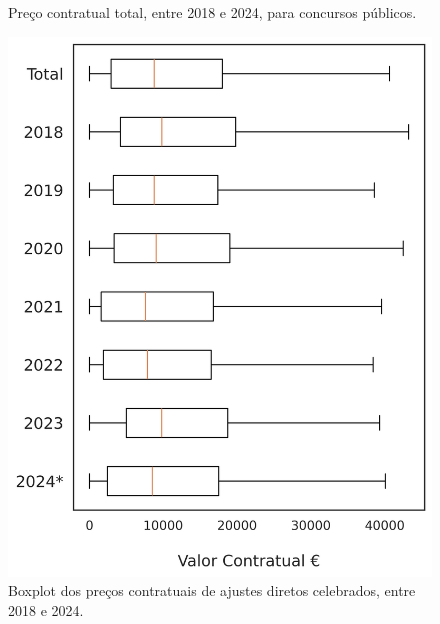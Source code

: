 \begin{figure}[H]
\begin{minipage}{.31\linewidth}
		\caption{Preço contratual total, entre 2018 e 2024, para concursos públicos.}
		\label{fig:precocps2}
	\end{minipage}
\end{figure}

\vfill

\begin{figure}[H]
	\centering
	\begin{minipage}{.31\linewidth}
		\includegraphics[width=\linewidth]{imagens/adir_stat.png}
		\caption{Boxplot dos preços contratuais de ajustes diretos celebrados, entre 2018 e 2024.}
		\label{fig:precoad}
	\end{minipage}
	\hfill
	\begin{minipage}{0.31\linewidth}

\end{minipage}
\end{figure}
